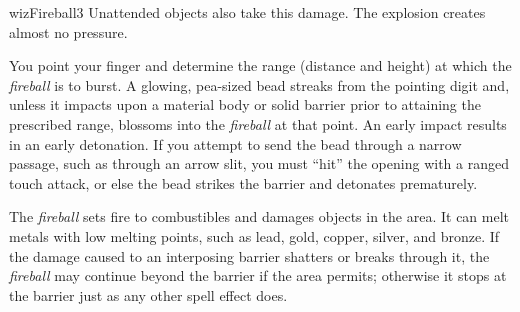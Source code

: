 \begin{spellcard}{wiz}{Fireball}{3}
  Unattended objects also take this damage. The explosion creates almost
  no pressure.

  You point your finger and determine the range (distance and height) at
  which the \emph{fireball} is to burst. A glowing, pea-sized bead streaks
  from the pointing digit and, unless it impacts upon a material body or
  solid barrier prior to attaining the prescribed range, blossoms into the
  \emph{fireball} at that point. An early impact results in an early
  detonation. If you attempt to send the bead through a narrow passage,
  such as through an arrow slit, you must ``hit'' the opening with a ranged
  touch attack, or else the bead strikes the barrier and detonates
  prematurely.

  The \emph{fireball} sets fire to combustibles and damages objects in the
  area. It can melt metals with low melting points, such as lead, gold,
  copper, silver, and bronze. If the damage caused to an interposing
  barrier shatters or breaks through it, the \emph{fireball} may continue
  beyond the barrier if the area permits; otherwise it stops at the
  barrier just as any other spell effect does.

\end{spellcard}
